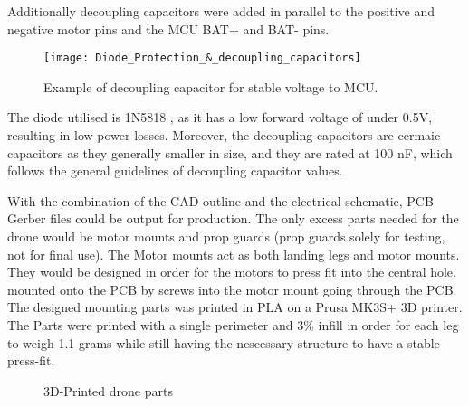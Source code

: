 \documentclass[12pt]{article}
\begin{document}
Additionally decoupling capacitors were added in 
parallel to the positive and negative motor pins 
and the MCU BAT+ and BAT- pins.

\begin{figure}[H]
    \begin{center}
    \texttt{[image: Diode\_Protection\_\&\_decoupling\_capacitors]}
    \end{center}
    \caption{Example of decoupling capacitor for stable voltage to MCU.}
    \label{fig:Diode_Protection_&_decoupling_capacitors}
\end{figure}

The diode utilised is 1N5818 \cite{1N5818}, as it has a low 
forward voltage of under 0.5V, resulting in low 
power losses. Moreover, the decoupling capacitors
are cermaic capacitors as they generally smaller
in size, and they are rated at 100 nF, which follows 
the general guidelines of decoupling capacitor values.
\cite{DecouplingCap}

With the combination of the CAD-outline and the electrical schematic, PCB Gerber files could be output for production. The only excess parts needed for the drone would be motor mounts and prop guards (prop guards solely for testing, not for final use). The Motor mounts act as both landing legs and motor mounts. They would be designed in order for the motors to press fit into the central hole, mounted onto the PCB by screws into the motor mount going through the PCB. The designed mounting parts was printed in PLA on a Prusa MK3S+ 3D printer. The Parts were printed with a single perimeter and 3\% infill in order for each leg to weigh 1.1 grams while still having the nescessary structure to have a stable press-fit. 

\begin{figure}[H]%
    \centering
    \qquad
    \qquad
    \caption{3D-Printed drone parts}%
    \label{fig:example}%
\end{figure}
\end{document}
